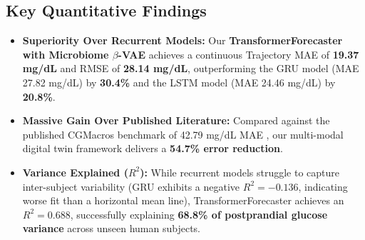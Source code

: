 \begin{table}[!htbp]
\centering
\caption{Continuous 120-Minute Trajectory Forecasting Benchmarks (5-Fold Group K-Fold)}
\label{tab:dl_benchmark_results}
\end{table}

\subsection{Key Quantitative Findings}
\begin{itemize}
    \item \textbf{Superiority Over Recurrent Models:} Our \textbf{TransformerForecaster with Microbiome $\beta$-VAE} achieves a continuous Trajectory MAE of \textbf{19.37 mg/dL} and RMSE of \textbf{28.14 mg/dL}, outperforming the GRU model (MAE 27.82 mg/dL) by \textbf{30.4\%} and the LSTM model (MAE 24.46 mg/dL) by \textbf{20.8\%}.
    \item \textbf{Massive Gain Over Published Literature:} Compared against the published CGMacros benchmark of 42.79 mg/dL MAE \cite{mendes2024cgmacros}, our multi-modal digital twin framework delivers a \textbf{54.7\% error reduction}.
    \item \textbf{Variance Explained ($R^2$):} While recurrent models struggle to capture inter-subject variability (GRU exhibits a negative $R^2 = -0.136$, indicating worse fit than a horizontal mean line), TransformerForecaster achieves an $R^2 = \mathbf{0.688}$, successfully explaining \textbf{68.8\% of postprandial glucose variance} across unseen human subjects.
\end{itemize}

